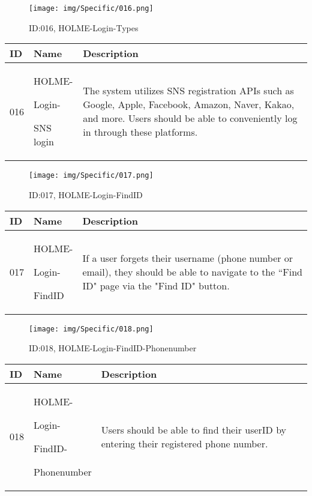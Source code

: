 \documentclass[conference]{IEEEtran}
\begin{document}
\begin{enumerate}
\begin{figure}[h]
\centering
\texttt{[image: img/Specific/016.png]}
\caption{ID:016, HOLME-Login-Types}
\end{figure}
\begin{table}[h]
\def\arraystretch{1.2} \small
    \begin{tabular}{|p{1cm}|p{1.8cm}|p{5.0cm}|}
        \hline
        ID & Name & Description\\ \hline
         016 \par  & HOLME-\par Login-\par SNS login &The system utilizes SNS registration APIs such as Google, Apple, Facebook, Amazon, Naver, Kakao, and more. Users should be able to conveniently log in through these platforms.\\ \hline
    \end{tabular}
\end{table}
\begin{figure}[h]
\centering
\texttt{[image: img/Specific/017.png]}
\caption{ID:017, HOLME-Login-FindID}
\end{figure}
\begin{table}[h]
\def\arraystretch{1.2} \small
    \begin{tabular}{|p{1cm}|p{1.8cm}|p{5.0cm}|}
        \hline
        ID & Name & Description\\ \hline
         017 \par  & HOLME-\par Login-\par FindID &If a user forgets their username (phone number or email), they should be able to navigate to the ``Find ID" page via the "Find ID" button.\\ \hline
    \end{tabular}
\end{table}

\clearpage

\begin{figure}[h]
\centering
\texttt{[image: img/Specific/018.png]}
\caption{ID:018, HOLME-Login-FindID-Phonenumber}
\end{figure}
\begin{table}[h]
\def\arraystretch{1.2} \small
    \begin{tabular}{|p{1cm}|p{1.8cm}|p{5.0cm}|}
        \hline
        ID & Name & Description\\ \hline
         018 \par  & HOLME-\par Login-\par FindID- \par Phonenumber &Users should be able to find their userID by entering their registered phone number.\\ \hline
    \end{tabular}
\end{table}


\end{enumerate}
\end{document}
